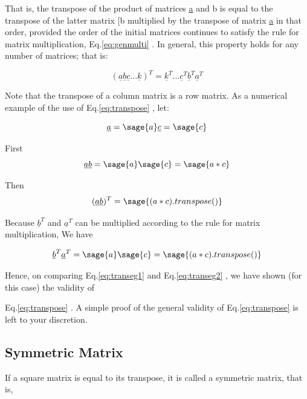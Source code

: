 \documentclass[12pt]{report}
\newcommand{\eref}[1]{
	Eq.\ref{#1}
}
\begin{document}
That is, the transpose of the product of matrices \underline{a} and
b is equal to the transpose of the latter matrix
[b multiplied by the transpose of matrix \underline{a} in
that order, provided the order of the initial matrices continues to
satisfy the rule for matrix multiplication,\eref{eq:genmulti}. In general,
this property holds for any number of matrices; that is:

\begin{equation}
	(\underline{a}\underline{b}\underline{c}...\underline{k})^T =
	 \underline{k}^T... \underline{c}^T\underline{b}^T\underline{a}^T 
\end{equation} 

Note that the transpose of a column matrix is a row matrix. As a
numerical example of the use of \eref{eq:transpose}, let:

$$\underline{a} = \sage{a}  \underline{c} = \sage{c}$$

First$$\underline{a}\underline{b} = \sage{a}\sage{c}=\sage{a*c}$$

Then 
\begin{equation}
	(\underline{a}\underline{b})^T= \sage{(a*c).transpose()}
	\label{eq:transeg1}
\end{equation}

Because $\underline{b}^T$ and $\underline{a}^T$ can be multiplied
according to the rule for matrix multiplication, We have

\begin{equation}
	\underline{b}^T\underline{a}^T = \sage{a} \sage{c} = 
	\sage{(a*c).transpose()}
	\label{eq:transeg2}
\end{equation}

Hence, on comparing \eref{eq:transeg1} and \eref{eq:transeg2}, 
we have shown (for this case) the validity of 
\eref{eq:transpose}. A simple proof of the general
validity of \eref{eq:transpose} is left to your discretion.


\subsection{Symmetric Matrix}

If a square matrix is equal to its transpose, it is called a symmetric
matrix, that is,
\end{document}
